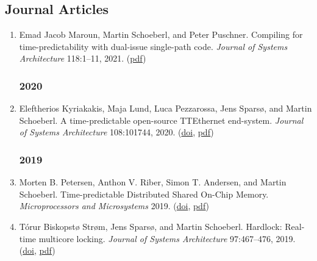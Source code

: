 \subsection*{Journal Articles}

\begin{enumerate}

\subsubsection*{2022}


\subsubsection*{2021}

\item Emad Jacob Maroun, Martin Schoeberl, and Peter Puschner.
 Compiling for time-predictability with dual-issue single-path code.
 \emph{Journal of Systems Architecture} 118:1--11, 2021.
(\href{https://www.jopdesign.com/doc/spvliw-jnl.pdf}{pdf})


\subsubsection*{2020}

\item Eleftherios Kyriakakis, Maja Lund, Luca Pezzarossa, Jens Spars{\o}, and Martin Schoeberl.
 A time-predictable open-source TTEthernet end-system.
 \emph{Journal of Systems Architecture} 108:101744, 2020.
(\href{http://dx.doi.org/https://doi.org/10.1016/j.sysarc.2020.101744}{doi}, \href{https://www.jopdesign.com/doc/ttenode-jnl.pdf}{pdf})


\subsubsection*{2019}

\item Morten B. Petersen, Anthon V. Riber, Simon T. Andersen, and Martin Schoeberl.
 Time-predictable Distributed Shared On-Chip Memory.
 \emph{Microprocessors and Microsystems} 2019.
(\href{http://dx.doi.org/10.1016/j.micpro.2019.102896}{doi}, \href{https://www.jopdesign.com/doc/tpdistmem-jnl.pdf}{pdf})

\item T{\'o}rur Biskopst{\o} Str{\o}m, Jens Spars{\o}, and Martin Schoeberl.
 Hardlock: Real-time multicore locking.
 \emph{Journal of Systems Architecture} 97:467--476, 2019.
(\href{http://dx.doi.org/10.1016/j.sysarc.2019.02.003}{doi}, \href{https://www.jopdesign.com/doc/hardlock-jnl.pdf}{pdf})


\end{enumerate}

